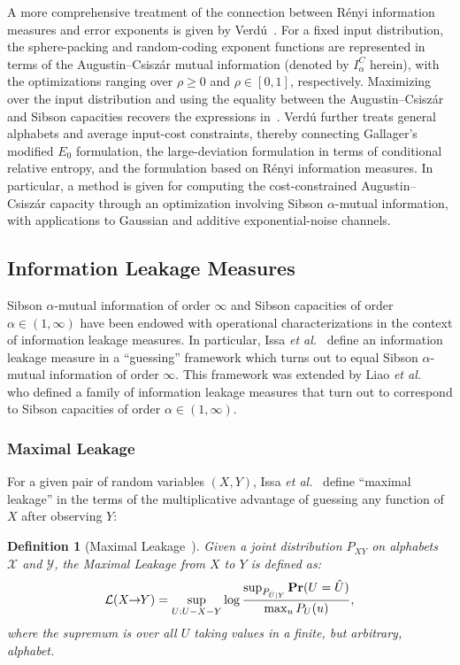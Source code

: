 \documentclass{article}
\numberwithin{theorem}{section}
\numberwithin{example}{section}
\numberwithin{remark}{section}
\newtheorem{definition}{Definition}
\numberwithin{definition}{section}
\def\Pr{{\rm \mathbf {Pr}}}
\newcommand{\X}{\mathcal{X}}
\newcommand{\Y}{\mathcal{Y}}
\newcommand{\revised}[1]{{\color{black} #1}}
\begin{document}
A more comprehensive treatment of the connection between Rényi information measures and error exponents is given by Verdú~\cite{verdu:2021error}. For a fixed input distribution, the sphere-packing and random-coding exponent functions are represented in terms of the Augustin--Csiszár mutual information (denoted by \(I_\alpha^C\) herein), with the optimizations ranging over \(\rho\geq 0\) and \(\rho\in[0,1]\), respectively. Maximizing over the input distribution and using the equality between the Augustin--Csiszár and Sibson capacities recovers the expressions in~. Verdú further treats general alphabets and average input-cost constraints, thereby connecting Gallager's modified \(E_0\) formulation, the large-deviation formulation in terms of conditional relative entropy, and the formulation based on Rényi information measures. In particular, a method is given for computing the cost-constrained Augustin--Csiszár capacity through an optimization involving Sibson \(\alpha\)-mutual information, with applications to Gaussian and additive exponential-noise channels.

\subsection{Information Leakage Measures} \label{sec:leakage}

Sibson $\alpha$-mutual information of order $\infty$ and Sibson capacities of order $\alpha \in (1,\infty)$ have been endowed with operational characterizations in the context of information leakage measures. In particular, Issa \emph{et al.}~\cite{MaximalLeakage:20} define an information leakage measure in a ``guessing'' framework which turns out to equal Sibson $\alpha$-mutual information of order $\infty$. This framework was extended by Liao \emph{et al.}~\cite{LiaoKSC:19} who defined a family of information leakage measures that turn out to correspond to Sibson capacities of order $\alpha \in (1,\infty)$.

\subsubsection{Maximal Leakage} \label{sec:max-leakage}
For a given pair of random variables $(X,Y)$, Issa \emph{et al.}~\cite{MaximalLeakage:20} define ``maximal leakage'' in the terms of the multiplicative advantage of guessing any function of $X$ after observing $Y$:

\begin{definition}[Maximal Leakage~{\cite[Definition 1] {MaximalLeakage:20}}] \label{def:maxLeakage} \revised{Given a joint distribution $P_{XY}$ on alphabets $\X$ and $\Y$, the Maximal Leakage from $X$ to $Y$ is defined as:}
\begin{align}
    \label{def:max-leakage}
    \mathcal{L}(X \!\! \to \!\! Y) = \sup_{U: U-X-Y} \log \frac{ \sup_{P_{\hat{U}|Y}} \Pr(U = \hat{U}) }{ \max_u P_U(u)},
\end{align}
where the supremum is over all $U$ taking values in a finite, but arbitrary, alphabet.
\end{definition}
\end{document}
